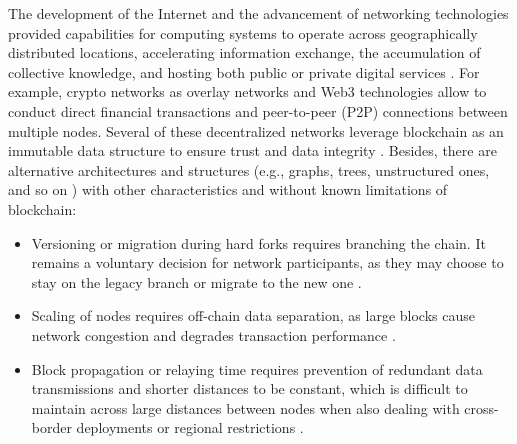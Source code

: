 The development of the Internet and the advancement of networking technologies provided capabilities for computing systems to operate across geographically distributed locations, accelerating information exchange, the accumulation of collective knowledge, and hosting both public or private digital services \cite[pp. 9–10]{leiner2009brief}. For example, crypto networks as overlay networks and Web3 technologies allow to conduct direct financial transactions and peer-to-peer (P2P) connections between multiple nodes. Several of these decentralized networks leverage blockchain as an immutable data structure to ensure trust and data integrity \cite[Ch. 3]{hassija2021framework}. Besides, there are alternative architectures and structures (e.g., graphs, trees, unstructured ones, and so on \cite[Ch. 6]{hassija2021framework}) with other characteristics and without known limitations of blockchain:
\begin{itemize}
    \item Versioning or migration during hard forks requires branching the chain. It remains a voluntary decision for network participants, as they may choose to stay on the legacy branch or migrate to the new one \cite[pp. 1–2]{conlon2024bitcoin}.
    \item Scaling of nodes requires off-chain data separation, as large blocks cause network congestion and degrades transaction performance \cite[Ch. 2–3]{chen2024comprehensive}.
    \item Block propagation or relaying time requires prevention of redundant data transmissions and shorter distances to be constant, which is difficult to maintain across large distances between nodes when also dealing with cross-border deployments or regional restrictions \cite{zhang2022speeding}.
\end{itemize}

